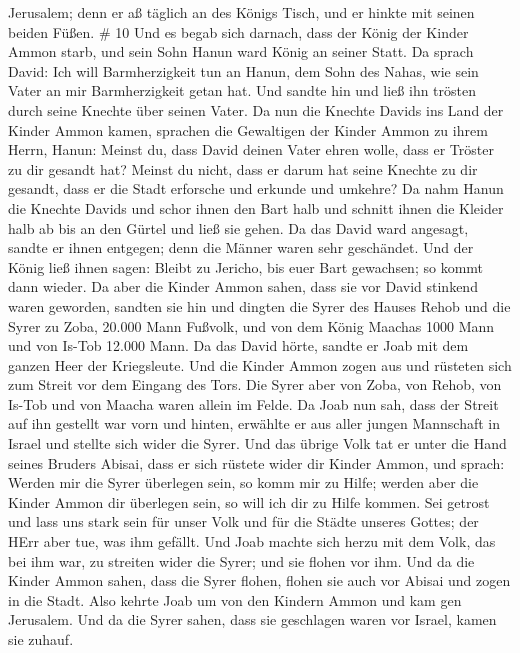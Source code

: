 Jerusalem; denn er aß täglich an des Königs Tisch, und er hinkte mit
seinen beiden Füßen. \# 10  Und es begab sich darnach, dass
der König der Kinder Ammon starb, und sein Sohn Hanun ward König an
seiner Statt.  Da sprach David: Ich will Barmherzigkeit tun
an Hanun, dem Sohn des Nahas, wie sein Vater an mir Barmherzigkeit getan
hat. Und sandte hin und ließ ihn trösten durch seine Knechte über seinen
Vater. Da nun die Knechte Davids ins Land der Kinder Ammon kamen,
 sprachen die Gewaltigen der Kinder Ammon zu ihrem Herrn,
Hanun: Meinst du, dass David deinen Vater ehren wolle, dass er Tröster
zu dir gesandt hat? Meinst du nicht, dass er darum hat seine Knechte zu
dir gesandt, dass er die Stadt erforsche und erkunde und umkehre?
 Da nahm Hanun die Knechte Davids und schor ihnen den Bart
halb und schnitt ihnen die Kleider halb ab bis an den Gürtel und ließ
sie gehen.  Da das David ward angesagt, sandte er ihnen
entgegen; denn die Männer waren sehr geschändet. Und der König ließ
ihnen sagen: Bleibt zu Jericho, bis euer Bart gewachsen; so kommt dann
wieder.  Da aber die Kinder Ammon sahen, dass sie vor David
stinkend waren geworden, sandten sie hin und dingten die Syrer des
Hauses Rehob und die Syrer zu Zoba, 20.000 Mann Fußvolk, und von dem
König Maachas 1000 Mann und von Is-Tob 12.000 Mann.  Da das
David hörte, sandte er Joab mit dem ganzen Heer der Kriegsleute.
 Und die Kinder Ammon zogen aus und rüsteten sich zum Streit
vor dem Eingang des Tors. Die Syrer aber von Zoba, von Rehob, von Is-Tob
und von Maacha waren allein im Felde.  Da Joab nun sah, dass
der Streit auf ihn gestellt war vorn und hinten, erwählte er aus aller
jungen Mannschaft in Israel und stellte sich wider die Syrer.
 Und das übrige Volk tat er unter die Hand seines Bruders
Abisai, dass er sich rüstete wider dir Kinder Ammon,  und
sprach: Werden mir die Syrer überlegen sein, so komm mir zu Hilfe;
werden aber die Kinder Ammon dir überlegen sein, so will ich dir zu
Hilfe kommen.  Sei getrost und lass uns stark sein für
unser Volk und für die Städte unseres Gottes; der HErr aber tue, was ihm
gefällt.  Und Joab machte sich herzu mit dem Volk, das bei
ihm war, zu streiten wider die Syrer; und sie flohen vor ihm.
 Und da die Kinder Ammon sahen, dass die Syrer flohen,
flohen sie auch vor Abisai und zogen in die Stadt. Also kehrte Joab um
von den Kindern Ammon und kam gen Jerusalem.  Und da die
Syrer sahen, dass sie geschlagen waren vor Israel, kamen sie zuhauf.
